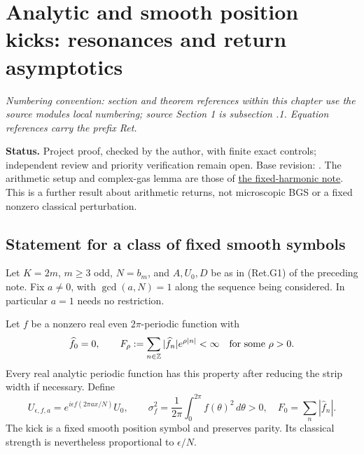 \hypertarget{analytic-and-smooth-position-kicks-resonances-and-return-asymptotics}{%
\section{Analytic and smooth position kicks: resonances and return asymptotics}\label{analytic-and-smooth-position-kicks-resonances-and-return-asymptotics}}
\par\smallskip\noindent\emph{Numbering convention: section and theorem references within this chapter use the source module\textquotesingle s local numbering; source Section 1 is subsection \thesection.1. Equation references carry the prefix Ret.}\par\smallskip

\textbf{Status.} Project proof, checked by the author, with finite exact controls;
independent review and priority verification remain open.
Base revision: .
The arithmetic setup and complex-gas lemma are those of
\href{https://github.com/ChurilovMaksim/BGS/blob/main/mathematics/fixed_harmonic_return_gas.md}{the fixed-harmonic note}.
This is a further result about arithmetic returns, not microscopic BGS
or a fixed nonzero classical perturbation.

\hypertarget{statement-for-a-class-of-fixed-smooth-symbols}{%
\subsection{Statement for a class of fixed smooth symbols}\label{statement-for-a-class-of-fixed-smooth-symbols}}

Let \(K=2m\), \(m\ge3\) odd, \(N=b_m\), and \(A,U_0,D\) be as in (Ret.G1)
of the preceding note. Fix \(a\ne0\), with \(\gcd(a,N)=1\) along the
sequence being considered. In particular \(a=1\) needs no restriction.

Let \(f\) be a nonzero real even \(2\pi\)-periodic function with
\[
 \widehat f_0=0,\qquad
 F_\rho:=\sum_{n\in\mathbb Z}|\widehat f_n|e^{\rho|n|}<\infty
                  \quad\hbox{for some }\rho>0.
\]
Every real analytic periodic function has this property after reducing
the strip width if necessary. Define
\[
 U_{\epsilon,f,a}
   =e^{i\epsilon f(2\pi ax/N)}U_0,\qquad
 \sigma_f^2=\frac1{2\pi}\int_0^{2\pi}f(\theta)^2\,d\theta>0,
 \quad F_0=\sum_n|\widehat f_n|.
\]
The kick is a fixed smooth position symbol and preserves parity.
Its classical strength is nevertheless proportional to \(\epsilon/N\).

